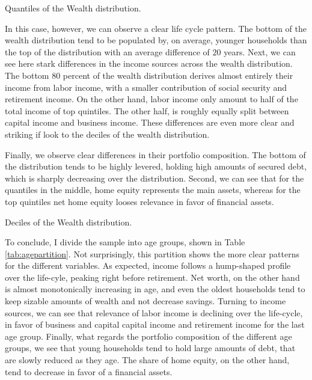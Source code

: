 \documentclass[11pt, a4paper, leqno]{article}
\begin{document}
\begin{table}[h]
    \caption{Quantiles of the Wealth distribution.}
    \resizebox{\textwidth}{!}{}
    \label{tab:quintilesnetworth}
\end{table}

In this case, however, we can observe a clear life cycle pattern. The bottom of the wealth distribution tend to be populated by, on average, younger households than the top of the distribution with an average difference of $20$ years. Next, we can see here stark differences in the income sources across the wealth distribution. The bottom $80$ percent of the wealth distribution derives almost entirely their income from labor income, with a smaller contribution of social security and retirement income. On the other hand, labor income only amount to half of the total income of top quintiles. The other half, is roughly equally split between capital income and business income. These differences are even more clear and striking if look to the deciles of the wealth distribution.

Finally, we observe clear differences in their portfolio composition. The bottom of the distribution tends to be highly levered, holding high amounts of secured debt, which is sharply decreasing over the distribution. Second, we can see that for the quantiles in the middle, home equity represents the main assets, whereas for the top quintiles net home equity looses relevance in favor of financial assets.

\begin{table}[h]
    \caption{Deciles of the Wealth distribution.}
    \resizebox{\textwidth}{!}{}
    \label{tab:decilesnetworth}
\end{table}

To conclude, I divide the sample into age groups, shown in Table \ref*{tab:agepartition}. Not surprisingly, this partition shows the more clear patterns for the different variables. As expected, income follows a hump-shaped profile over the life-cyle, peaking right before retirement. Net worth, on the other hand is almost monotonically increasing in age, and even the oldest households tend to keep sizable amounts of wealth and not decrease savings. Turning to income sources, we can see that relevance of labor income is declining over the life-cycle, in favor of business and capital capital income and retirement income for the last age group. Finally, what regards the portfolio composition of the different age groups, we see that young households tend to hold large amounts of debt, that are slowly reduced as they age. The share of home equity, on the other hand, tend to decrease in favor of a financial assets.
\end{document}
